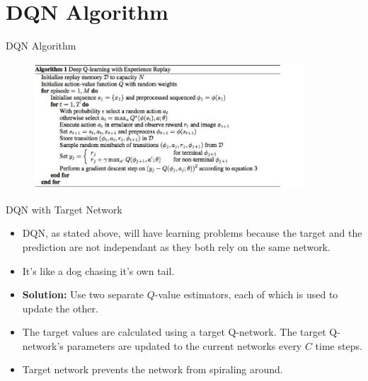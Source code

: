 \section{DQN Algorithm}

\begin{frame}{DQN Algorithm}
    \begin{figure}
        \centering
        \includegraphics[width=0.9\textwidth,height=0.9\textheight,keepaspectratio]{images/dqn+sarsa/dqn.png}
    \end{figure}
\end{frame}

\begin{frame}{DQN with Target Network}
    \begin{itemize}
        \item DQN, as stated above, will have learning problems because the target and the prediction are not independant as they both rely on the same network.
        \item It's like a dog chasing it's own tail.
        \pause
        \item \textbf{Solution:} Use two separate $Q$-value estimators, each of which is used to update the other.
        \item The target values are calculated using a target Q-network. The target Q-network's parameters are updated to the current networks every $C$ time steps.
        \item Target network prevents the network from spiraling around.
    \end{itemize}
\end{frame}

